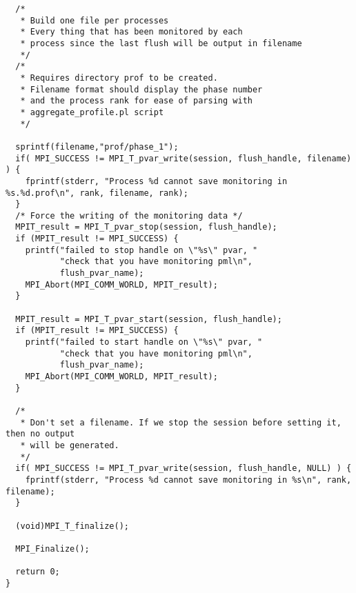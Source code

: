 \documentclass[notitlepage]{article}
\begin{document}
\begin{verbatim}
  /* 
   * Build one file per processes
   * Every thing that has been monitored by each
   * process since the last flush will be output in filename
   */
  /*
   * Requires directory prof to be created.
   * Filename format should display the phase number
   * and the process rank for ease of parsing with
   * aggregate_profile.pl script
   */

  sprintf(filename,"prof/phase_1");
  if( MPI_SUCCESS != MPI_T_pvar_write(session, flush_handle, filename) ) {
    fprintf(stderr, "Process %d cannot save monitoring in %s.%d.prof\n", rank, filename, rank);
  }
  /* Force the writing of the monitoring data */
  MPIT_result = MPI_T_pvar_stop(session, flush_handle);
  if (MPIT_result != MPI_SUCCESS) {
    printf("failed to stop handle on \"%s\" pvar, "
           "check that you have monitoring pml\n",
           flush_pvar_name);
    MPI_Abort(MPI_COMM_WORLD, MPIT_result);
  }

  MPIT_result = MPI_T_pvar_start(session, flush_handle);
  if (MPIT_result != MPI_SUCCESS) {
    printf("failed to start handle on \"%s\" pvar, "
           "check that you have monitoring pml\n",
           flush_pvar_name);
    MPI_Abort(MPI_COMM_WORLD, MPIT_result);
  }

  /* 
   * Don't set a filename. If we stop the session before setting it, then no output
   * will be generated.
   */
  if( MPI_SUCCESS != MPI_T_pvar_write(session, flush_handle, NULL) ) {
    fprintf(stderr, "Process %d cannot save monitoring in %s\n", rank, filename);
  }

  (void)MPI_T_finalize();

  MPI_Finalize();
  
  return 0;
}

\end{verbatim}
\end{document}
